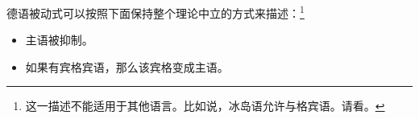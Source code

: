 德语被动式可以按照下面保持整个理论中立的方式来描述：\footnote{
这一描述不能适用于其他语言。比如说，冰岛语允许与格宾语。请看\citet*{ZMT85a}。
}
\begin{itemize}
\item 主语被抑制。
\item 如果有宾格宾语，那么该宾格变成主语。
\end{itemize}

